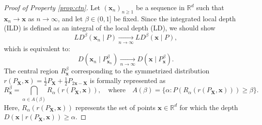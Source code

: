 \documentclass[final,3p,times]{elsarticle}
\newcommand{\vecx}{\mathbf{x}}
\newcommand{\vecX}{\mathbf{X}}
\begin{document}
\begin{proof}[Proof of Property \ref{prop:ctn}]
        Let $(\vecx_n)_{n \geq 1}$ be a sequence in $\mathbb{R}^d$ such that $\vecx_n \to \vecx$ as $n \to \infty$, and let $\beta \in (0,1]$ be fixed. Since the integrated local depth (ILD) is defined as an integral of the local depth (LD), we should show
    \[
    LD^\beta(\vecx_n \mid P) \xrightarrow[n \to \infty]{} LD^\beta(\vecx \mid P),
    \]
    which is equivalent to:
    \[
    D(\vecx_n \mid P^{\beta}_{\vecx_n}) \xrightarrow[n \to \infty]{} D(\vecx \mid P^\beta_\vecx).
    \]
     The central region $R^\beta_{\vecx}$ corresponding to the symmetrized distribution $r(P_{\vecX}, \vecx) = \frac{1}{2}P_{\vecX} + \frac{1}{2}P_{2\vecx - \vecX}$ is formally represented as
\[
R^\beta_{\vecx} = \bigcap_{\alpha \in A(\beta)} R_\alpha(r(P_\vecX, \vecx)), \quad \text{where} \quad A(\beta) = \{\alpha : P(R_\alpha(r(P_\vecX, \vecx))) \geq \beta\}.
\]
Here, $R_\alpha(r(P_\vecX, \vecx))$ represents the set of points $\vecx \in \mathbb{R}^d$ for which the depth $D(\vecx \mid r(P_\vecX, \vecx)) \geq \alpha$.


\end{proof}
\end{document}
